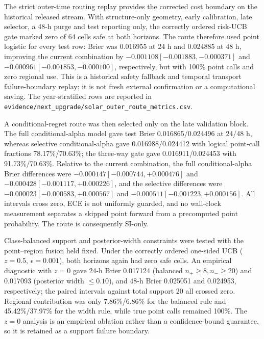 \documentclass[11pt,a4paper]{article}
\numberwithin{equation}{section}
\theoremstyle{definition}\newtheorem{definition}[theorem]{Definition}
\theoremstyle{remark}\newtheorem{remark}[theorem]{Remark}
\begin{document}
The strict outer-time routing replay provides the corrected cost boundary on the historical released stream. With structure-only geometry, early calibration, late selector, a 48-h purge and test reporting only, the correctly ordered risk-UCB gate marked zero of 64 cells safe at both horizons. The route therefore used point logistic for every test row: Brier was 0.016955 at 24 h and 0.024885 at 48 h, improving the current combination by $-0.001108[-0.001883,-0.000371]$ and $-0.000961[-0.001853,-0.000100]$, respectively, but with 100\% point calls and zero regional use. This is a historical safety fallback and temporal transport failure-boundary replay; it is not fresh external confirmation or a computational saving. The year-stratified rows are reported in \texttt{evidence/next\_upgrade/solar\_outer\_route\_metrics.csv}.

A conditional-regret route was then selected only on the late validation block. The full conditional-alpha model gave test Brier 0.016865/0.024496 at 24/48 h, whereas selective conditional-alpha gave 0.016988/0.024412 with logical point-call fractions 78.17\%/70.63\%; the three-way gate gave 0.016911/0.024453 with 91.73\%/70.63\%. Relative to the current combination, the full conditional-alpha Brier differences were $-0.000147[-0.000744,+0.000476]$ and $-0.000428[-0.001117,+0.000226]$, and the selective differences were $-0.000023[-0.000583,+0.000567]$ and $-0.000511[-0.001223,+0.000156]$. All intervals cross zero, ECE is not uniformly guarded, and no wall-clock measurement separates a skipped point forward from a precomputed point probability. The route is consequently SI-only.

Class-balanced support and posterior-width constraints were tested with the point--region fusion held fixed. Under the correctly ordered one-sided UCB ($z=0.5$, $\epsilon=0.001$), both horizons again had zero safe cells. An empirical diagnostic with $z=0$ gave 24-h Brier 0.017124 (balanced $n_+\ge8,n_-\ge20$) and 0.017093 (posterior width $\le0.10$), and 48-h Brier 0.025051 and 0.024953, respectively; the paired intervals against total support 20 all crossed zero. Regional contribution was only 7.86\%/6.86\% for the balanced rule and 45.42\%/37.97\% for the width rule, while true point calls remained 100\%. The $z=0$ analysis is an empirical ablation rather than a confidence-bound guarantee, so it is retained as a support failure boundary.
\end{document}
